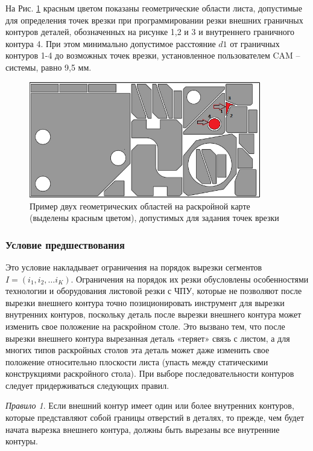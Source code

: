 \documentclass{article}
\begin{document}
На Рис. \ref{pierce-area} красным цветом показаны геометрические области листа,
допустимые для определения точек врезки при программировании резки
внешних граничных контуров деталей,
обозначенных на рисунке 1,2 и 3 и внутреннего граничного контура 4.
При этом минимально допустимое расстояние $d1$ от граничных контуров 1-4 до возможных точек врезки,
установленное пользователем CAM – системы, равно 9,5 мм.

\begin{figure}
  \begin{center}
  \includegraphics[width=0.9\textwidth]{pierce-area.png}
  \caption{Пример двух геометрических областей на раскройной карте (выделены красным цветом), допустимых для задания точек врезки }
  \label{pierce-area}
  \end{center}
\end{figure}

\subsubsection{Условие предшествования}

Это условие накладывает ограничения на порядок вырезки сегментов
$ I = (i_1, i_2, \dots i_K)$.
Ограничения на порядок их резки обусловлены особенностями
технологии и оборудования листовой резки с ЧПУ,
которые не позволяют после вырезки внешнего контура точно
позиционировать инструмент для вырезки внутренних контуров,
поскольку деталь после вырезки внешнего контура может
изменить свое положение на раскройном столе.
Это вызвано тем, что после вырезки внешнего контура
вырезанная деталь «теряет» связь с листом,
а для многих типов раскройных столов эта деталь
может даже изменить свое положение относительно плоскости листа
(упасть между статическими конструкциями раскройного стола).
При выборе последовательности контуров следует придерживаться следующих правил.

{\it Правило 1}.
Если внешний контур имеет один или более внутренних контуров,
которые представляют собой границы отверстий в деталях,
то прежде, чем будет начата вырезка внешнего контура,
должны быть вырезаны все внутренние контуры.
\end{document}
